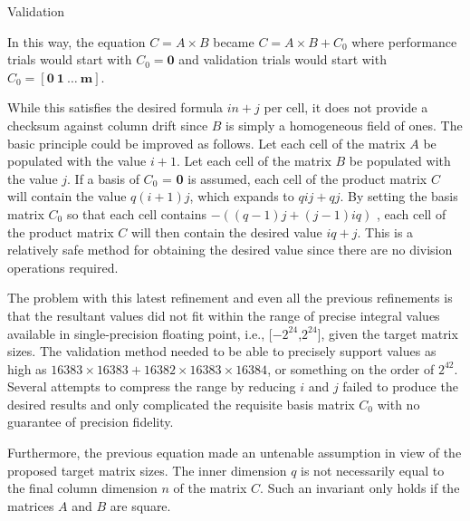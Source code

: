 \documentclass{article}
\begin{document}
\begin{section}{Validation}
\begin{paragraph}{}
    In this way, the equation $C = A \times B$ became $C = A \times B + C_{0}$ where performance trials would start with
    $C_{0} = \textbf{0}$ and validation trials would start with $C_{0} = [\textbf{0}\ \textbf{1}\ \ldots\ \textbf{m}]$.
  \end{paragraph}
  \begin{paragraph}{}
    While this satisfies the desired formula $in + j$ per cell, it does not provide a checksum against column drift
    since $B$ is simply a homogeneous field of ones. The basic principle could be improved as follows. Let each cell of the matrix
    $A$ be populated with the value $i + 1$. Let each cell of the matrix $B$ be populated with the value $j$. If a basis
    of $C_{0}$ = \textbf{0} is assumed, each cell of the product matrix $C$ will contain the value $q(i + 1)j$, which expands to
    $qij + qj$. By setting the basis matrix $C_{0}$ so that each cell contains $-((q-1)j + (j-1)iq)$ , each cell of the product matrix $C$
    will then contain the desired value $iq + j$. This is a relatively safe method for obtaining the desired value since there are no
    division operations required.
  \end{paragraph}
  \begin{paragraph}{}
    The problem with this latest refinement and even all the previous refinements is that the resultant values did not fit within the range of precise integral
    values available in single-precision floating point, i.e., [$-2^{24}$,$2^{24}$]\autocite{SPIntLimit}, given the target matrix sizes. The validation
    method needed to be able to precisely support values as high as $16383 \times 16383 + 16382 \times 16383 \times 16384$, or something on the order
    of $2^{42}$. Several attempts to compress the range by reducing $i$ and $j$ failed to produce the desired results and only complicated the requisite
    basis matrix $C_{0}$ with no guarantee of precision fidelity.
  \end{paragraph}
  \begin{paragraph}{}
    Furthermore, the previous equation made an untenable assumption in view of the proposed target matrix sizes. The inner dimension $q$ is not
    necessarily equal to the final column dimension $n$ of the matrix $C$. Such an invariant only holds if the matrices $A$ and $B$ are square.
  \end{paragraph}
\end{section}
\end{document}
